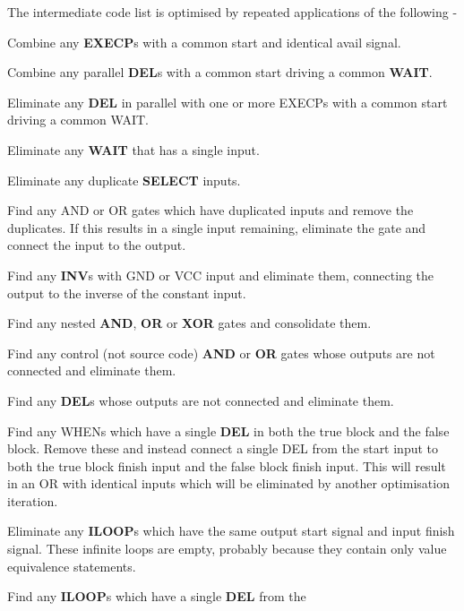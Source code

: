         The intermediate code list is optimised by repeated applications of
        the following -
        \blist
        \item   Combine any {\bf EXECP}s with a common start and identical avail
                signal.
        \item   Combine any parallel {\bf DEL}s with a common start
                driving a common {\bf WAIT}.
        \item   Eliminate any {\bf DEL} in parallel with one or more EXECPs with
                a common start driving a common WAIT.
        \item   Eliminate any {\bf WAIT} that has a single input.
        \item   Eliminate any duplicate {\bf SELECT} inputs.
        \item   Find any AND or OR gates which have duplicated inputs
                and remove the duplicates. If this results in a single
                input remaining, eliminate the gate and connect
                the input to the output.
        \item   Find any {\bf INV}s with GND or VCC input and eliminate
                them, connecting the output to the inverse of the constant
                input.
        \item   Find any nested {\bf AND}, {\bf OR} or {\bf XOR} gates and
                consolidate them.
        \item   Find any control (not source code) {\bf AND} or {\bf OR} gates
                whose outputs are not connected and eliminate them.
        \item   Find any {\bf DEL}s whose outputs are not connected and
                eliminate them.
        \item   Find any WHENs which have a single {\bf DEL} in both the true
                block and the false block. Remove these and instead connect a
                single DEL from the start input to both the true block finish
                input and the false block finish input. This will result in
                an OR with identical inputs which will be eliminated by
                another optimisation iteration.
        \item   Eliminate any {\bf ILOOP}s which have the same output start
                signal and input finish signal. These infinite loops are
                empty, probably because they contain only value equivalence
                statements.
        \item   Find any {\bf ILOOP}s which have a single {\bf DEL} from the
